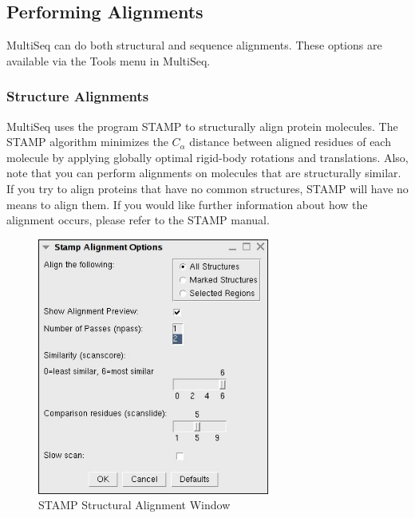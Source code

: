 \subsection {Performing Alignments}
MultiSeq can do both structural and sequence alignments.  These options
are available via the \textsf{Tools} menu in MultiSeq.


\subsubsection {Structure Alignments}
MultiSeq uses the program STAMP to structurally align protein molecules.
The STAMP algorithm minimizes the $C_\alpha$ distance between aligned
residues of each molecule by applying globally optimal rigid-body
rotations and translations. Also, note that you can perform alignments
on molecules that are structurally similar. If you try to align proteins
that have no common structures, STAMP will have no means to align them.
If you would like further information about how the alignment occurs,
please refer to the STAMP manual.
\begin{figure}[here]
 \centerline{\includegraphics [width=3in]{./pictures/stamp.jpg}}
 \caption{STAMP Structural Alignment Window}%
 \label{stampWindow}
\end{figure}

